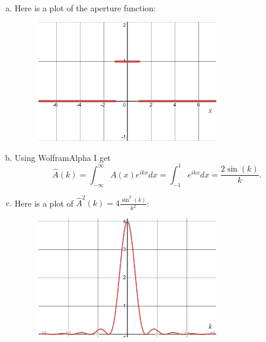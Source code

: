 \documentclass[12pt]{article} %
\begin{document}
\begin{solution}~
\begin{enumerate}[(a)]
\item Here is a plot of the aperture function:
\begin{figure}[H]
	\centering
	\includegraphics[width=0.75\textwidth]{aperture.png}
\end{figure}

\item Using WolframAlpha I get
	\[
	\hat{A}(k) = \int_{-\infty}^\infty A(x) e^{ikx}dx = \int_{-1}^1 e^{ikx}dx = \frac{2 \sin(k)}{k}.
	\]

\item Here is a plot of $\hat{A}^2(k) = 4 \frac{\sin^2(k)}{k^2}$:
\begin{figure}[H]
	\centering
	\includegraphics[width=0.75\textwidth]{a_hat.png}
\end{figure}


\end{enumerate}
\end{solution}
\end{document}
